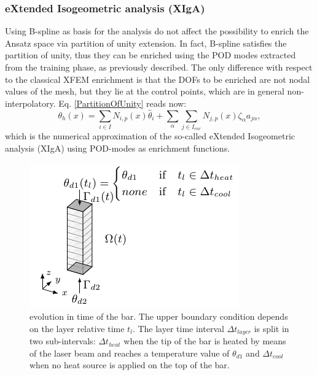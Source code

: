 \documentclass[3p]{article}
\begin{document}
\subsubsection*{eXtended Isogeometric analysis (XIgA)}
Using B-spline as basis for the analysis do not affect the possibility to enrich the Ansatz space via partition of unity extension. In fact, B-spline satisfies the partition of unity, thus they can be enriched using the POD modes extracted from the training phase, as previously described. The only difference with respect to the classical XFEM enrichment is that the DOFs to be enriched are not nodal values of the mesh, but they lie at the control points, which are in general non-interpolatory. Eq. \ref{PartitionOfUnity} reads now:
\begin{equation}
\theta_{h}(x) = \sum_{i\in I} N_{i,p}(x)\hat{\theta}_{i} + \sum_{\alpha}\sum_{j\in I_{enr}} N_{j,p}(x)\zeta_{\alpha}a_{j\alpha},
\label{IgAPartitionOfUnity}
\end{equation}
which is the numerical approximation of the so-called eXtended Isogeometric analysis (XIgA) using POD-modes as enrichment functions.

\begin{figure}[h!]
\centering
\includegraphics[width=0.8\linewidth]{externals/Pictures/PODXIGAProblemDomain.pdf}
\caption{evolution in time of the bar. The upper boundary condition depends on the layer relative time $t_{l}$. The layer time interval $\Delta t_{layer}$ is split in two sub-intervals: $\Delta t_{heat}$ when the tip of the bar is heated by means of the laser beam and reaches a temperature value of $\theta_{d1}$ and $\Delta t_{cool}$ when no heat source is applied on the top of the bar.}
\label{PODXIGADomain}
\end{figure}
\end{document}
